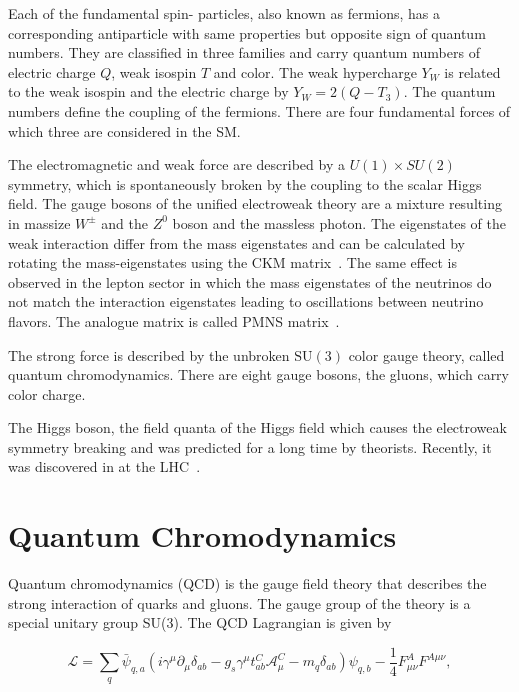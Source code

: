 Each of the fundamental spin- particles, also known as fermions,
has a corresponding antiparticle with same properties but opposite sign of
quantum numbers. They are classified in three families and carry quantum numbers
of electric charge $Q$, weak isospin $T$ and color. The weak hypercharge $Y_W$
is related to the weak isospin and the electric charge by $Y_W = 2(Q-T_3)$. The
quantum numbers define the coupling of the fermions. There are four fundamental
forces of which three are considered in the SM.

The electromagnetic and weak force are described by a $U(1)\times SU(2)$
symmetry, which is spontaneously broken by the coupling to the scalar Higgs
field. The gauge bosons of the unified electroweak theory are a mixture
resulting in massize $W^\pm$ and the $Z^0$ boson and the massless photon. The
eigenstates of the weak interaction differ from the mass eigenstates and can be
calculated by rotating the mass-eigenstates using the CKM
matrix~\cite{Cabibbo:1963yz,Kobayashi:1973fv}. The same effect is observed in
the lepton sector in which the mass eigenstates of the neutrinos do not match
the interaction eigenstates leading to oscillations between neutrino flavors.
The analogue matrix is called PMNS matrix~\cite{Maki:1962mu,Pontecorvo:1957qd}.

The strong force is described by the unbroken $\mathrm{SU}(3)$ color gauge
theory, called quantum chromodynamics. There are eight gauge bosons, the gluons,
which carry color charge. 

The Higgs boson, the field quanta of the Higgs field which causes the
electroweak symmetry breaking and was predicted for a long time by theorists.
Recently, it was discovered in at the LHC~\cite{Chatrchyan:2012xdj,Aad:2012tfa}.

\section{Quantum Chromodynamics}

Quantum chromodynamics (QCD) is the gauge field theory that describes the
strong interaction of quarks and gluons. The gauge group of the theory is a
special unitary group SU(3). The QCD Lagrangian is given by

\begin{equation*}
   \mathcal{L} = \sum_q \bar \psi_{q,a} \left( i \gamma^\mu \partial_\mu
   \delta_{ab} - g_s \gamma^\mu t_{ab}^C \mathcal{A}_{\mu}^C - m_q \delta_{ab}
   \right) \psi_{q,b} - \frac{1}{4} F_{\mu\nu}^{A} F^{A \mu\nu},
\end{equation*}

